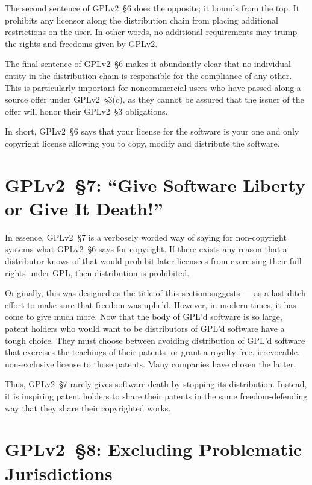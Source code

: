 The second sentence of GPLv2~\S6 does the opposite; it bounds from the top.  It
prohibits any licensor along the distribution chain from placing
additional restrictions on the user.  In other words, no additional
requirements may trump the rights and freedoms given by GPLv2\@.

The final sentence of GPLv2~\S6 makes it abundantly clear that no individual
entity in the distribution chain is responsible for the compliance of any
other.  This is particularly important for noncommercial users who have
passed along a source offer under GPLv2~\S3(c), as they cannot be assured that
the issuer of the offer will honor their GPLv2~\S3 obligations.

In short, GPLv2~\S6 says that your license for the software is your one and
only copyright license allowing you to copy, modify and distribute the
software.

\section{GPLv2~\S7: ``Give Software Liberty or Give It Death!''}
\label{GPLv2s7}

In essence, GPLv2~\S7 is a verbosely worded way of saying for non-copyright
systems what GPLv2~\S6 says for copyright.  If there exists any reason that a
distributor knows of that would prohibit later licensees from exercising
their full rights under GPL, then distribution is prohibited.

Originally, this was designed as the title of this section suggests --- as
a last ditch effort to make sure that freedom was upheld.  However, in
modern times, it has come to give much more.  Now that the body of GPL'd
software is so large, patent holders who would want to be distributors of
GPL'd software have a tough choice.  They must choose between avoiding
distribution of GPL'd software that exercises the teachings of their
patents, or grant a royalty-free, irrevocable, non-exclusive license to
those patents.  Many companies have chosen the latter.

Thus, GPLv2~\S7 rarely gives software death by stopping its distribution.
Instead, it is inspiring patent holders to share their patents in the same
freedom-defending way that they share their copyrighted works.

\section{GPLv2~\S8: Excluding Problematic Jurisdictions}
\label{GPLv2s8}

